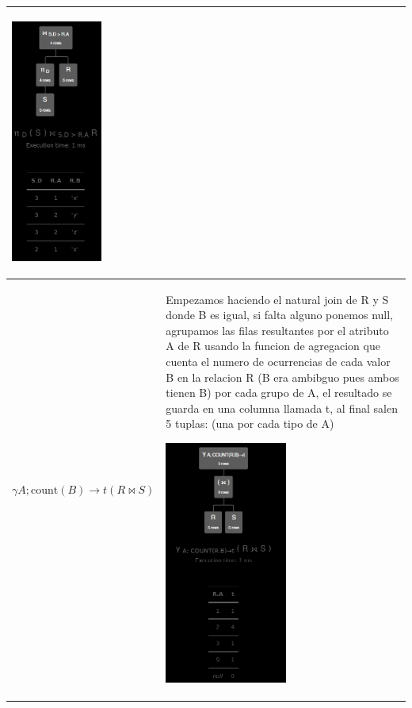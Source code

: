 \begin{longtable}{|p{4.3cm}|p{12cm}|}
    \begin{center}
        \includegraphics[height=8cm]{../resources/pregunta1/1.9.png}
    \end{center}
    \\ \hline
    
    \textbf{$\gamma A; \text{count}(B) \to t (R \bowtie S)$} & 
    Empezamos haciendo el natural join de R y S donde B es igual, si falta alguno ponemos null, agrupamos las filas resultantes por el atributo A de R usando la funcion de agregacion que cuenta el numero de ocurrencias de cada valor B en la relacion R (B era ambibguo pues ambos tienen B) por cada grupo de A, el resultado se guarda en una columna llamada t, al final salen 5 tuplas: (una por cada tipo de A)

    \begin{center}
        \includegraphics[height=8cm]{../resources/pregunta1/1.10.png}
    \end{center}
    \\ \hline
\end{longtable}
 
\vspace{1cm}
